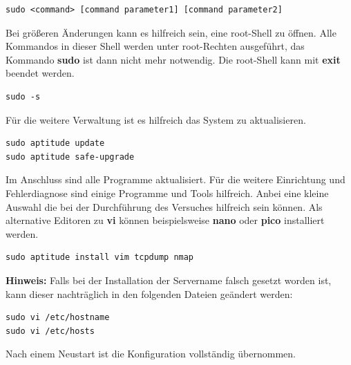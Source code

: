 \begin{lstlisting}
sudo <command> [command parameter1] [command parameter2] 
\end{lstlisting}

Bei größeren Änderungen kann es hilfreich sein, eine root-Shell zu öffnen. Alle
Kommandos in dieser Shell werden unter root-Rechten ausgeführt, das Kommando
\textbf{sudo} ist dann nicht mehr notwendig. Die root-Shell kann mit 
\textbf{exit} beendet werden.

\begin{lstlisting}
sudo -s
\end{lstlisting}

Für die weitere Verwaltung ist es hilfreich das System zu aktualisieren.

\begin{lstlisting}
sudo aptitude update
sudo aptitude safe-upgrade 
\end{lstlisting}

Im Anschluss sind alle Programme aktualisiert. Für die weitere Einrichtung und
Fehlerdiagnose sind einige Programme und Tools hilfreich. Anbei eine kleine
Auswahl die bei der Durchführung des Versuches hilfreich sein können.
Als alternative Editoren zu \textbf{vi} können beispielsweise \textbf{nano}
oder \textbf{pico} installiert werden.

\begin{lstlisting}
sudo aptitude install vim tcpdump nmap
\end{lstlisting}

\textbf{Hinweis:} Falls bei der Installation der Servername falsch gesetzt
worden ist, kann dieser nachträglich in den folgenden Dateien geändert werden:
\begin{lstlisting}
sudo vi /etc/hostname
sudo vi /etc/hosts
\end{lstlisting}
Nach einem Neustart ist die Konfiguration vollständig übernommen.


